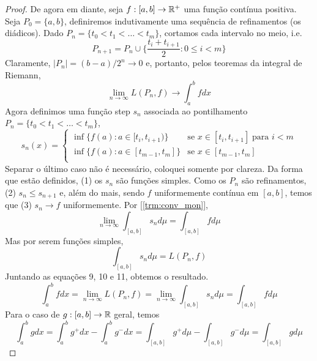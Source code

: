 \begin{proof}
    De agora em diante, seja $f:[a,b] \rightarrow \mathbb{R}^+$ uma função contínua positiva.
    Seja $P_0 = \{a,b\}$, definiremos indutivamente uma sequência de refinamentos (os diádicos).
    Dado $P_n = \{t_0 < t_1 < \dots < t_m\}$, cortamos cada intervalo no meio, i.e.
    $$P_{n+1} = P_n \cup \bigg\{\frac{t_i + t_{i+1}}{2} : 0 \leq i < m\bigg\}$$
    Claramente, $|P_n| = (b-a)/2^n \to 0$ e, portanto, pelos teoremas da integral de Riemann,
    \begin{equation}
        \lim_{n \to \infty} L(P_n,f) \to \int_a^b fdx
    \end{equation}
    Agora definimos uma função step $s_n$ associada ao pontilhamento $P_n = \{t_0 < t_1 < \dots < t_m\}$,
    $$s_n(x) = \begin{cases}
        \inf\{f(a): a \in [t_i, t_{i+1})\} & \text{se } x \in [t_i, t_{i+1}]\; \text{para } i < m\\
        \inf\{f(a): a \in [t_{m-1}, t_{m}]\} & \text{se } x \in [t_{m-1}, t_{m}]\\
    \end{cases}$$
    Separar o último caso não é necessário, coloquei somente por clareza. Da forma que estão definidos,
    (1) os $s_n$ são funções simples. Como os $P_n$ são refinamentos, (2) $s_{n} \leq s_{n+1}$ e, além do mais,
    sendo $f$ uniformemente contínua em $[a,b]$, temos que (3) $s_n \to f$ uniformemente. Por [\ref{trm:conv_mon}],
    \begin{equation}
        \lim_{n\to \infty} \int_{[a,b]} s_n d\mu= \int_{[a,b]} f d\mu
    \end{equation}
    Mas por serem funções simples,
    \begin{equation}
        \int_{[a,b]} s_n d\mu = L(P_n, f)
    \end{equation}
    Juntando as equações 9, 10 e 11, obtemos o resultado.
    $$\int_a^b fdx = \lim_{n \to \infty} L(P_n, f) = \lim_{n\to\infty }\int_{[a,b]} s_n d\mu = \int_{[a,b]} fd\mu$$
    Para o caso de $g : [a,b] \rightarrow \mathbb{R}$ geral, temos 
    $$\int_{a}^{b} g dx = \int_{a}^{b} g^+ dx - \int_{a}^{b} g^- dx = \int_{[a,b]}g^+ d\mu - \int_{[a,b]}g^- d\mu = \int_{[a,b]}g d\mu$$ 
\end{proof}

